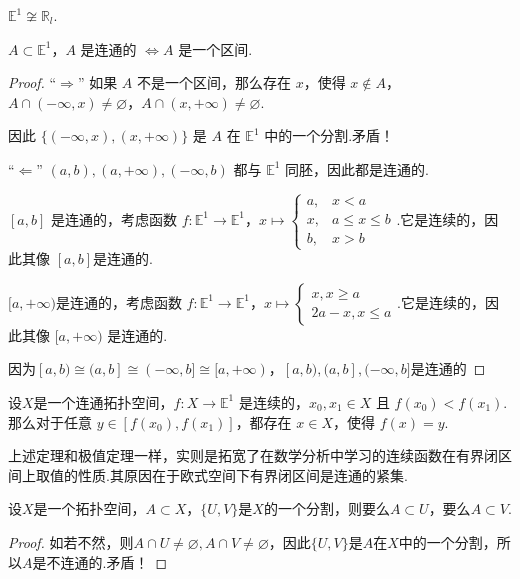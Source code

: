\begin{instance}
    $\mathbb{E}^1 \not\cong \mathbb{R}_l$.
\end{instance}

\begin{instance}
    $A \subset \mathbb{E}^1$，$A$ 是连通的 $\iff A$ 是一个区间.
\end{instance}
\begin{proof}
    “$\Rightarrow$” 如果 $A$ 不是一个区间，那么存在 $x$，使得 $x \notin A$，$A \cap (-\infty, x) \neq \varnothing$，$A \cap (x, +\infty) \neq \varnothing$.\par
    因此 $\{(-\infty, x), (x, +\infty)\}$ 是 $A$ 在 $\mathbb{E}^1$ 中的一个分割.矛盾！ \par
    “$\Leftarrow$” $(a, b), (a, +\infty), (-\infty, b)$ 都与 $\mathbb{E}^1$ 同胚，因此都是连通的.\par
    $[a, b]$ 是连通的，考虑函数 $f: \mathbb{E}^1 \to \mathbb{E}^1$，$x \mapsto \begin{cases} a, & x<a \\ x, & a \leq x \leq b \\ b, & x>b \end{cases}$.它是连续的，因此其像 $[a,b]$是连通的.\par
    $[a,+\infty)$是连通的，考虑函数 $f: \mathbb{E}^1 \to \mathbb{E}^1$，$x \mapsto \begin{cases}
        x , x\geq a\\
        2a-x,x\leq a
    \end{cases}$.它是连续的，因此其像 $[a,+\infty)$ 是连通的.\par
    因为$[a,b) \cong (a,b] \cong (-\infty,b] \cong [a, +\infty) $，$[a,b),(a,b],(-\infty,b]$是连通的
\end{proof}

\begin{theorem}[介值定理][thm:7.2]
    设$X$是一个连通拓扑空间，$f: X \to \mathbb{E}^1$ 是连续的，$x_0, x_1 \in X$ 且 $f(x_0) < f(x_1)$.那么对于任意 $y \in \left[f(x_0), f(x_1)\right]$，都存在 $x \in X$，使得 $f(x) = y$.
\end{theorem}
上述定理和极值定理一样，实则是拓宽了在数学分析中学习的连续函数在有界闭区间上取值的性质.其原因在于欧式空间下有界闭区间是连通的紧集.



\begin{lemma}[][lem:7.2]
    设$X$是一个拓扑空间，$A\subset X$，$\{U,V\}$是$X$的一个分割，则要么$A\subset U$，要么$A\subset V$.
\end{lemma}
\begin{proof}
    如若不然，则$A\cap U \neq \varnothing,A\cap V \neq \varnothing$，因此$\{U,V\}$是$A$在$X$中的一个分割，所以$A$是不连通的.矛盾！
\end{proof}


